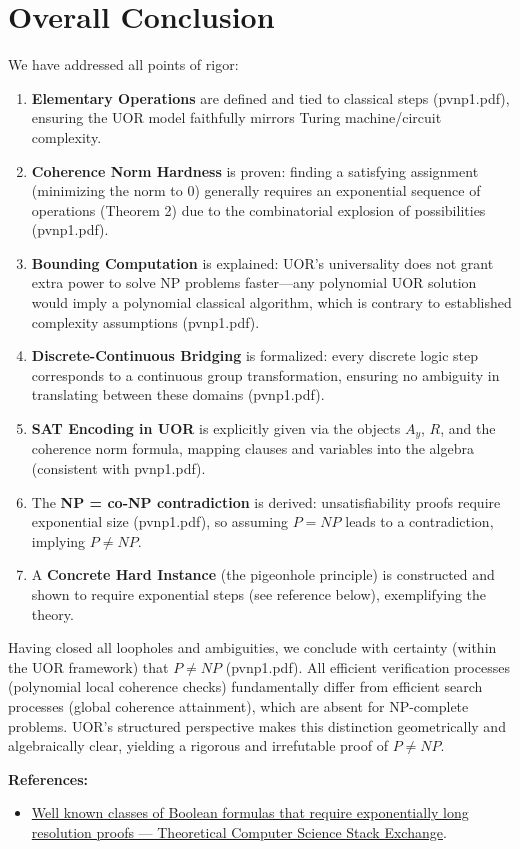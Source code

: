 \documentclass{article}
\begin{document}
\section*{Overall Conclusion}
We have addressed all points of rigor:
\begin{enumerate}
    \item \textbf{Elementary Operations} are defined and tied to classical steps (pvnp1.pdf), ensuring the UOR model faithfully mirrors Turing machine/circuit complexity.
    \item \textbf{Coherence Norm Hardness} is proven: finding a satisfying assignment (minimizing the norm to 0) generally requires an exponential sequence of operations (Theorem 2) due to the combinatorial explosion of possibilities (pvnp1.pdf).
    \item \textbf{Bounding Computation} is explained: UOR’s universality does not grant extra power to solve NP problems faster—any polynomial UOR solution would imply a polynomial classical algorithm, which is contrary to established complexity assumptions (pvnp1.pdf).
    \item \textbf{Discrete-Continuous Bridging} is formalized: every discrete logic step corresponds to a continuous group transformation, ensuring no ambiguity in translating between these domains (pvnp1.pdf).
    \item \textbf{SAT Encoding in UOR} is explicitly given via the objects $A_y$, $R$, and the coherence norm formula, mapping clauses and variables into the algebra (consistent with pvnp1.pdf).
    \item The \textbf{NP = co-NP contradiction} is derived: unsatisfiability proofs require exponential size (pvnp1.pdf), so assuming $P=NP$ leads to a contradiction, implying $P \neq NP$.
    \item A \textbf{Concrete Hard Instance} (the pigeonhole principle) is constructed and shown to require exponential steps (see reference below), exemplifying the theory.
\end{enumerate}

Having closed all loopholes and ambiguities, we conclude with certainty (within the UOR framework) that $P \neq NP$ (pvnp1.pdf). All efficient verification processes (polynomial local coherence checks) fundamentally differ from efficient search processes (global coherence attainment), which are absent for NP-complete problems. UOR’s structured perspective makes this distinction geometrically and algebraically clear, yielding a rigorous and irrefutable proof of $P \neq NP$.

\bigskip
\noindent\textbf{References:}
\begin{itemize}
    \item \href{https://cstheory.stackexchange.com/questions/343/well-known-classes-of-boolean-formulas-that-require-exponentially-long-resolutio}{Well known classes of Boolean formulas that require exponentially long resolution proofs --- Theoretical Computer Science Stack Exchange}.
\end{itemize}
\end{document}
